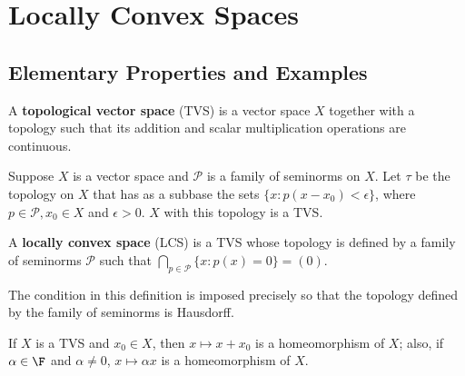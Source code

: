 %
%
%
\chapter{Locally Convex Spaces}
\label{LocConv} %




\section{Elementary Properties and Examples}
\label{sec:locConvSpace}


\begin{defn}
    A \textbf{topological vector space} (TVS) is a vector space $X$ together with a topology such that its addition and scalar multiplication operations are continuous.
\end{defn}

Suppose $X$ is a vector space and $\mathscr{P}$ is a family of seminorms on $X$. Let $\tau$ be the topology on $X$ that has as a subbase the sets $\{x:p(x-x_0) < \epsilon\}$, where $p \in \mathscr{P},x_0 \in X$ and $\epsilon > 0$. $X$ with this topology is a TVS.

\begin{defn}
    A \textbf{locally convex space} (LCS) is a TVS whose topology is defined by a family of seminorms $\mathscr{P}$ such that $\bigcap_{p \in \mathscr{P}}\{x:p(x) = 0\} = (0)$.
\end{defn}

The condition in this definition is imposed precisely so that the topology defined by the family of seminorms is Hausdorff.

If $X$ is a TVS and $x_0 \in X$, then $x\mapsto x+x_0$ is a homeomorphism of $X$; also, if $\alpha \in \F$ and $\alpha \neq 0$, $x\mapsto \alpha x$ is a homeomorphism of $X$.

